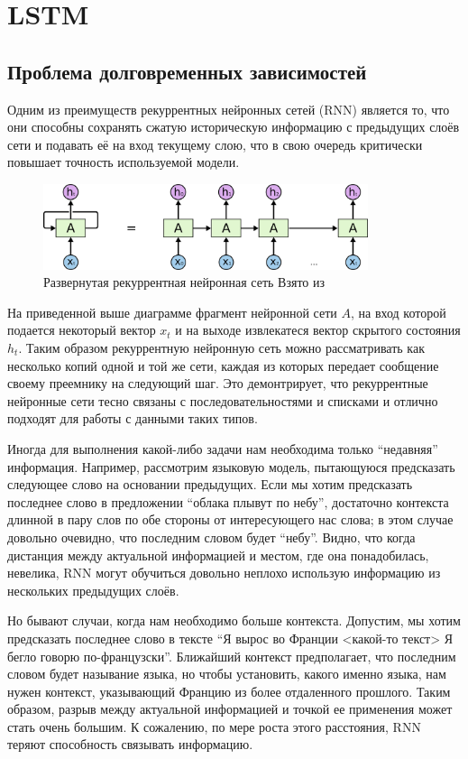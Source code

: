 \documentclass[14pt]{extarticle}
\begin{document}
\section{LSTM}

\subsection{Проблема долговременных зависимостей}

Одним из преимуществ рекуррентных нейронных сетей (RNN) является то, что они способны сохранять сжатую историческую информацию с предыдущих слоёв сети и подавать её на вход текущему слою, что в свою очередь критически повышает точность используемой модели.

\begin{figure}[h]
	\centering
	\includegraphics[width=0.85\textwidth]{img/RNN-unrolled.png}
	\caption{Развернутая рекуррентная нейронная сеть Взято из \cite{Colah}}
	\label{fig:rnn}
\end{figure}

На приведенной выше диаграмме фрагмент нейронной сети $A$, на вход которой подается некоторый вектор $x_t$ и на выходе извлекатеся вектор скрытого состояния $h_t$. Таким образом рекуррентную нейронную сеть можно рассматривать как несколько копий одной и той же сети, каждая из которых передает сообщение своему преемнику на следующий шаг. Это демонтрирует, что рекуррентные нейронные сети тесно связаны с последовательностями и списками и отлично подходят для работы с данными таких типов. 

Иногда для выполнения какой-либо задачи нам необходима только “недавняя” информация. Например, рассмотрим языковую модель, пытающуюся предсказать следующее слово на основании предыдущих. Если мы хотим предсказать последнее слово в предложении “облака плывут по небу”, достаточно контекста длинной в пару слов по обе стороны от интересующего нас слова; в этом случае довольно очевидно, что последним словом будет “небу”. Видно, что когда дистанция между актуальной информацией и местом, где она понадобилась, невелика, RNN могут обучиться довольно неплохо использую информацию из нескольких предыдущих слоёв.

Но бывают случаи, когда нам необходимо больше контекста. Допустим, мы хотим предсказать последнее слово в тексте “Я вырос во Франции <какой-то текст> Я бегло говорю по-французски”. Ближайший контекст предполагает, что последним словом будет называние языка, но чтобы установить, какого именно языка, нам нужен контекст, указывающий Францию из более отдаленного прошлого. Таким образом, разрыв между актуальной информацией и точкой ее применения может стать очень большим. К сожалению, по мере роста этого расстояния, RNN теряют способность связывать информацию.
\end{document}
